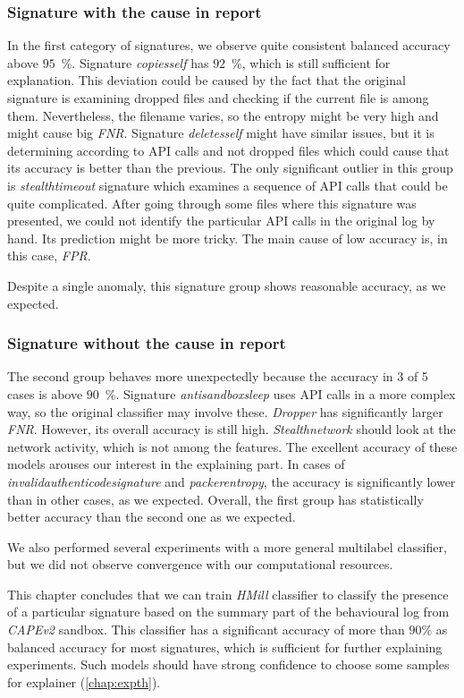 \subsubsection*{Signature with the cause in report}
In the first category of signatures, we observe quite consistent balanced accuracy above $95$~\%. Signature \emph{copiesself} has $92$~\%, which is still sufficient for explanation. This deviation could be caused by the fact that the original signature is examining dropped files and checking if the current file is among them. Nevertheless, the filename varies, so the entropy might be very high and might cause big \emph{FNR}. Signature \emph{deletesself} might have similar issues, but it is determining according to API calls and not dropped files which could cause that its accuracy is better than the previous. The only significant outlier in this group is \emph{stealthtimeout} signature which examines a sequence of API calls that could be quite complicated. After going through some files where this signature was presented, we could not identify the particular API calls in the original log by hand. Its prediction might be more tricky. The main cause of low accuracy is, in this case, \emph{FPR}.

Despite a single anomaly, this signature group shows reasonable accuracy, as we expected.

\subsubsection*{Signature without the cause in report}
The second group behaves more unexpectedly because the accuracy in 3 of 5 cases is above $90$~\%. Signature \emph{antisandboxsleep} uses API calls in a more complex way, so the original classifier may involve these. \emph{Dropper} has significantly larger \emph{FNR}. However, its overall accuracy is still high. \emph{Stealthnetwork} should look at the network activity, which is not among the features. The excellent accuracy of these models arouses our interest in the explaining part. In cases of \emph{invalidauthenticodesignature} and \emph{packerentropy}, the accuracy is significantly lower than in other cases, as we expected. Overall, the first group has statistically better accuracy than the second one as we expected.

We also performed several experiments with a more general multilabel classifier, but we did not observe convergence with our computational resources.

This chapter concludes that we can train \emph{HMill} classifier to classify the presence of a particular signature based on the summary part of the behavioural log from \emph{CAPEv2} sandbox. This classifier has a significant accuracy of more than $90\%$ as balanced accuracy for most signatures, which is sufficient for further explaining experiments. Such models should have strong confidence to choose some samples for explainer (\ref{chap:expth}). 


